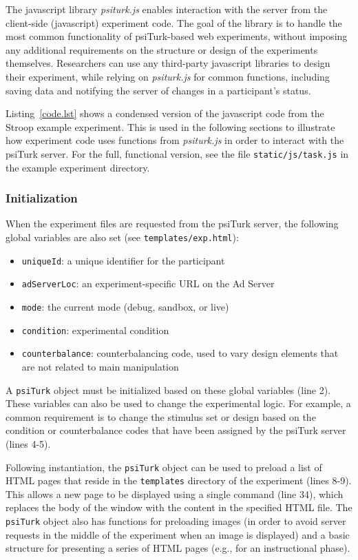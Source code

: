 \documentclass[twocolumn]{svjour3}          %
\begin{document}
The javascript library \emph{psiturk.js} enables interaction with the server from the client-side (javascript) experiment code.
The goal of the library is to handle the most common functionality of psiTurk-based web experiments, without imposing any additional requirements on the structure or design of the experiments themselves.
Researchers can use any third-party javascript libraries to design their experiment, while relying on \emph{psiturk.js} for common functions, including saving data and notifying the server of changes in a participant's status.

Listing~\ref{code.lst} shows a condensed version of the javascript code from the Stroop example experiment.
This is used in the following sections to illustrate how experiment code uses functions from \emph{psiturk.js} in order to interact with the psiTurk server.
For the full, functional version, see the file \texttt{static/js/task.js} in the example experiment directory.

\subsubsection{Initialization}

When the experiment files are requested from the psiTurk server, the following global variables are also set (see \texttt{templates/exp.html}):

\begin{itemize}
\item \texttt{uniqueId}: a unique identifier for the participant
\item \texttt{adServerLoc}: an experiment-specific URL on the Ad Server
\item \texttt{mode}: the current mode (debug, sandbox, or live)
\item \texttt{condition}: experimental condition
\item \texttt{counterbalance}: counterbalancing code, used to vary design elements that are not related to main manipulation 
\end{itemize}

A \texttt{psiTurk} object must be initialized based on these global variables (line 2).
These variables can also be used to change the experimental logic.
For example, a common requirement is to change the stimulus set or design based on the condition or counterbalance codes that have been assigned by the psiTurk server (lines 4-5).

Following instantiation, the \texttt{psiTurk} object can be used to preload a list of HTML pages that reside in the \texttt{templates} directory of the experiment (lines 8-9).
This allows a new page to be displayed using a single command (line 34), which replaces the body of the window with the content in the specified HTML file.
The \texttt{psiTurk} object also has functions for preloading images (in order to avoid server requests in the middle of the experiment when an image is displayed) and a basic structure for presenting a series of HTML pages (e.g., for an instructional phase).
\end{document}
